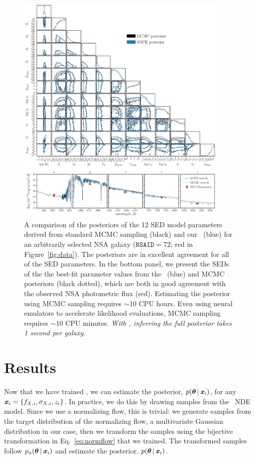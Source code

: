 \begin{figure}
\begin{center}
    \includegraphics[width=0.9\textwidth]{figs/corner.pdf}
    \caption{\label{fig:corner}
    A comparison of the posteriors of the 12 SED model parameters derived from
    standard MCMC sampling (black) and our \sedflow~(blue) for an arbitrarily
    selected NSA galaxy ($\mathtt{NSAID} = 72$; red in Figure~\ref{fig:data}).
    The posteriors are in excellent agreement for all of the SED parameters. 
    In the bottom panel, we present the SEDs of the the best-fit parameter
    values from the \sedflow~(blue) and MCMC posteriors (black dotted), which
    are both in good agreement with the observed NSA photometric flux (red). 
    Estimating the posterior using MCMC sampling requires $\sim$10 CPU hours. 
    Even using neural emulators to accelerate likelihood evaluations, MCMC
    sampling requires $\sim$10 CPU minutes. 
    \emph{With \sedflow, inferring the full posterior takes 1 second per
    galaxy.}
    }
\end{center}
\end{figure}

\section{Results} \label{sec:results}
Now that we have trained \sedflow, we can estimate the posterior,
$p(\boldsymbol{\theta}\,|\, \textbf{\textit{x}}_i)$, for any 
$\textbf{\textit{x}}_i = \{f_{X,i}, \sigma_{X,i}, z_i \}$. 
In practice, we do this by drawing samples from the \sedflow~NDE model. 
Since we use a normalizing flow, this is trivial:
we generate samples from the target distribution of the normalizing flow,  a
multivariate Gaussian distribution in our case, then we transform the samples
using the bijective transformation in Eq.~\ref{eq:normflow} that we trained.
The transformed samples follow $p_\phi(\boldsymbol{\theta}\,|\, \textbf{\textit{x}}_i)$ and 
estimate the posterior, $p(\boldsymbol{\theta}\,|\, \textbf{\textit{x}}_i)$. 

